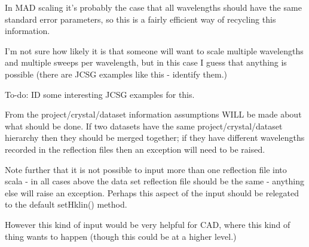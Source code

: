 \documentclass[a4paper, 11pt]{article}
\begin{document}
In MAD scaling it's probably the case that all wavelengths should have the 
same standard error parameters, so this is a fairly efficient way of 
recycling this information.

I'm not sure how likely it is that someone will want to scale multiple
wavelengths and multiple sweeps per wavelength, but in this case I guess
that anything is possible (there are JCSG examples like this - identify 
them.)

To-do: ID some interesting JCSG examples for this.

From the project/crystal/dataset information assumptions WILL be made about
what should be done. If two datasets have the same project/crystal/dataset
hierarchy then they should be merged together; if they have different 
wavelengths recorded in the reflection files then an exception will need
to be raised.

Note further that it is not possible to input more than one reflection
file into scala - in all cases above the data set reflection file
should be the same - anything else will raise an exception. Perhaps this 
aspect of the input should be relegated to the default setHklin() method.

However this kind of input would be very helpful for CAD, where this kind
of thing wants to happen (though this could be at a higher level.)
\end{document}
